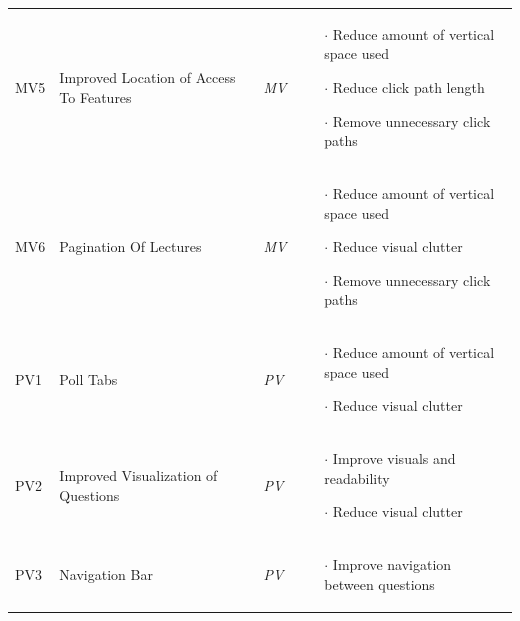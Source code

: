 \begin{small}
\begin{longtable}{ p{0.7cm} p{3.8cm} p{1cm} p{6.6cm}}
		MV5 & Improved Location of Access To Features &\emph{MV} &
		\vspace{-0.45cm}	
		\begin{itemize}[leftmargin=*, noitemsep, topsep=0pt]
			\item[$\cdot$] Reduce amount of vertical space used
			\item[$\cdot$] Reduce click path length
			\item[$\cdot$] Remove unnecessary click paths
		\end{itemize} \vspace{-0.45cm} \\ 
		MV6 & Pagination Of Lectures &\emph{MV} & 
		\vspace{-0.45cm}	
		\begin{itemize}[leftmargin=*, noitemsep, topsep=0pt]
			\item[$\cdot$] Reduce amount of vertical space used
			\item[$\cdot$] Reduce visual clutter
			\item[$\cdot$] Remove unnecessary click paths
		\end{itemize} \vspace{-0.45cm} \\ 
		PV1 & Poll Tabs & \emph{PV} &
		\vspace{-0.45cm}	
		\begin{itemize}[leftmargin=*, noitemsep, topsep=0pt]
			\item[$\cdot$] Reduce amount of vertical space used
			\item[$\cdot$] Reduce visual clutter
		\end{itemize} \vspace{-0.45cm} \\ 
		PV2 & Improved Visualization of Questions & \emph{PV} &
		\vspace{-0.45cm}	
		\begin{itemize}[leftmargin=*, noitemsep, topsep=0pt]
			\item[$\cdot$] Improve visuals and readability
			\item[$\cdot$] Reduce visual clutter
		\end{itemize} \vspace{-0.45cm} \\ 
		PV3 & Navigation Bar & \emph{PV} &
		\vspace{-0.45cm}	
		\begin{itemize}[leftmargin=*, noitemsep, topsep=0pt]
			\item[$\cdot$] Improve navigation between questions

\end{itemize}
\end{longtable}
\end{small}
